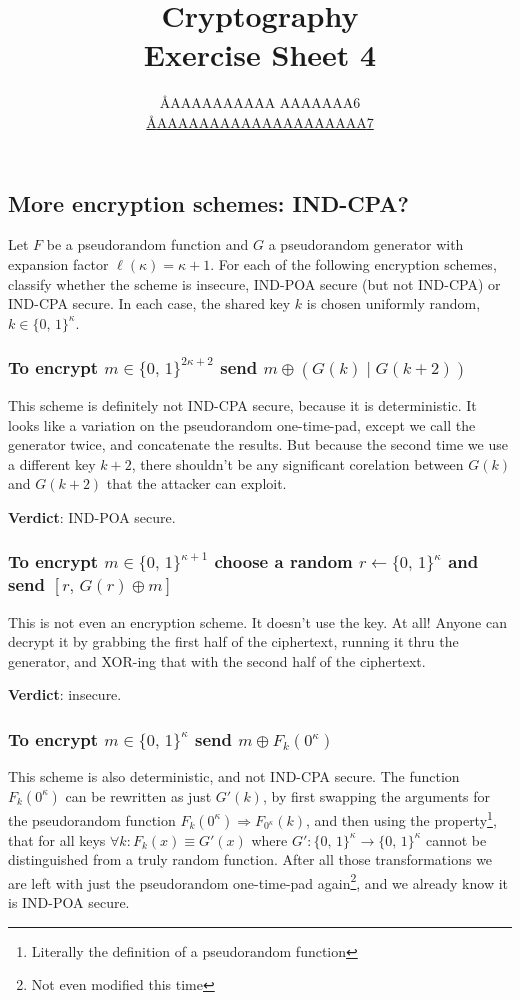 \documentclass{article}
\title{Cryptography \\ Exercise Sheet 4}
\author{
  \AA{AAAAAAAAAA AAAAAAA}{6} \\
  \href{mailto:\AA{AAAAAAAAAAAAAAAAAAAA}{7}}{\AA{AAAAAAAAAAAAAAAAAAAA}{7}}
}
\begin{document}
  \maketitle

  \setcounter{section}{4}
  \subsection{More encryption schemes: IND-CPA?}
  \begin{centerframebox}
    Let $F$ be a pseudorandom function and $G$ a pseudorandom generator with expansion factor $\ell(\kappa) = \kappa + 1$.
    For each of the following encryption schemes, classify whether the scheme is insecure, IND-POA secure (but not IND-CPA) or IND-CPA secure.
    In each case, the shared key $k$ is chosen uniformly random, $k \in \{0,\, 1\}^\kappa$.

  \end{centerframebox}
  \subsubsection{To encrypt $m \in \{0,\, 1\}^{2\kappa+2}$ send $m \oplus (G(k) \mid G(k + 2))$}
  This scheme is definitely not IND-CPA secure, because it is deterministic.
  It looks like a variation on the pseudorandom one-time-pad, except we call the generator twice,
  and concatenate the results.
  But because the second time we use a different key $k + 2$,
  there shouldn't be any significant corelation between $G(k)$ and $G(k + 2)$ that the attacker can exploit.

  \textbf{Verdict}: IND-POA secure.

  \subsubsection{To encrypt $m \in \{0,\, 1\}^{\kappa+1}$ choose a random $r \leftarrow \{0,\, 1\}^\kappa$ and send $[r,\, G(r) \oplus m]$}
  This is not even an encryption scheme. It doesn't use the key. At all!
  Anyone can decrypt it by grabbing the first half of the ciphertext, running it thru the generator, and XOR-ing that with the second half of the ciphertext.

  \textbf{Verdict}: insecure.

  \subsubsection{To encrypt $m \in \{0,\, 1\}^{\kappa}$ send $m \oplus F_k(0^\kappa)$}
  This scheme is also deterministic, and not IND-CPA secure.
  The function $F_k(0^\kappa)$ can be rewritten as just $G'(k)$,
  by first swapping the arguments for the pseudorandom function $F_k(0^\kappa) \Rightarrow F_{0^\kappa}(k)$,
  and then using the property\footnote{Literally the definition of a pseudorandom function},
  that for all keys $\forall k : F_k(x) \equiv G'(x)$ where $G': \{0,\, 1\}^{\kappa} \to \{0,\, 1\}^{\kappa}$ cannot be distinguished from a truly random function.
  After all those transformations we are left with just the pseudorandom one-time-pad again\footnote{Not even modified this time},
  and we already know it is IND-POA secure.
\end{document}
